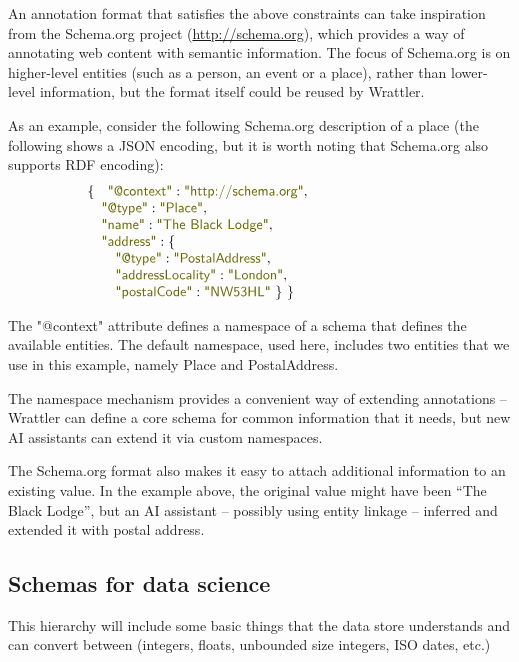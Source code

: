 \documentclass[sigplan,preprint,10pt]{acmart}\settopmatter{printfolios=true,printccs=false,printacmref=false}
\theoremstyle{plain}
\theoremstyle{definition}
\newcommand{\str}[1]{\textnormal{\textcolor{strclr}{\sffamily "#1"}}}
\begin{document}
{An annotation format that satisfies the above constraints can take inspiration from the 
Schema.org project (\url{http://schema.org}), which provides a way of annotating web content
with semantic information. The focus of Schema.org is on higher-level entities (such as 
a person, an event or a place), rather than lower-level information, but the format itself could
be reused by Wrattler.

As an example, consider the following Schema.org description of a place (the following shows a
JSON encoding, but it is worth noting that Schema.org also supports RDF encoding):
%
\begin{equation*}
\begin{array}{l}
\{~~\; \str{@context}: \str{http://schema.org},\\
\quad  \str{@type}: \str{Place},\\
\quad  \str{name}: \str{The Black Lodge},\\
\quad  \str{address}: \{\\
\qquad    \str{@type}: \str{PostalAddress},\\
\qquad    \str{addressLocality}: \str{London},\qquad\qquad\qquad\qquad\qquad~\\
\qquad    \str{postalCode}: \str{NW53HL} ~\}~\}\\
\end{array}
\end{equation*}

\noindent
The \str{@context} attribute defines a namespace of a schema that defines the available
entities. The default namespace, used here, includes two entities that we use in this 
example, namely Place and PostalAddress.

The namespace mechanism provides a convenient way of extending annotations -- Wrattler can
define a core schema for common information that it needs, but new AI assistants can 
extend it via custom namespaces.

The Schema.org format also makes it easy to attach additional information to an existing
value. In the example above, the original value might have been ``The Black Lodge'', but 
an AI assistant -- possibly using entity linkage -- inferred and extended it with postal address.

\subsection{Schemas for data science}
\label{sec:datastore-schema}

{\color{red}
This hierarchy will include some basic things that the data store understands and can
convert between (integers, floats, unbounded size integers, ISO dates, etc.)

}}
\end{document}
